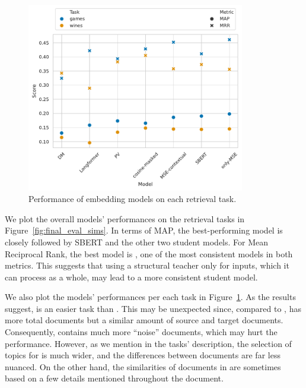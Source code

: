 \begin{figure}[t]

  \centering
  \includegraphics[width=0.85\textwidth]{img/final_sims_evals_per_task.pdf}

  \caption{Performance of embedding models on each retrieval task.}

  \label{fig:final_eval_sims_per_task}

\end{figure}

We plot the overall models' performances on the retrieval tasks in
Figure~\ref{fig:final_eval_sims}. In terms of MAP, the best-performing model is
{\OnlyMSEStudent} closely followed by SBERT and the other two student models.
For Mean Reciprocal Rank, the best model is {\CosineStudent}, one
of the most consistent models in both metrics. This suggests that using
a structural teacher only for inputs, which it can process as a whole, may lead to a
more consistent student model.


We also plot the models' performances per each task in
Figure~\ref{fig:final_eval_sims_per_task}. As the results suggest, 
is an easier task than . This may be unexpected since, compared to
,  has more total documents but a similar amount of
source and target documents. Consequently,  contains much more
``noise'' documents, which may hurt the performance. However, as we mention in
the tasks' description, the selection of topics for  is much wider,
and the differences between documents are far less nuanced. On the other hand,
the similarities of documents in  are sometimes based on a few
details mentioned throughout the document.
